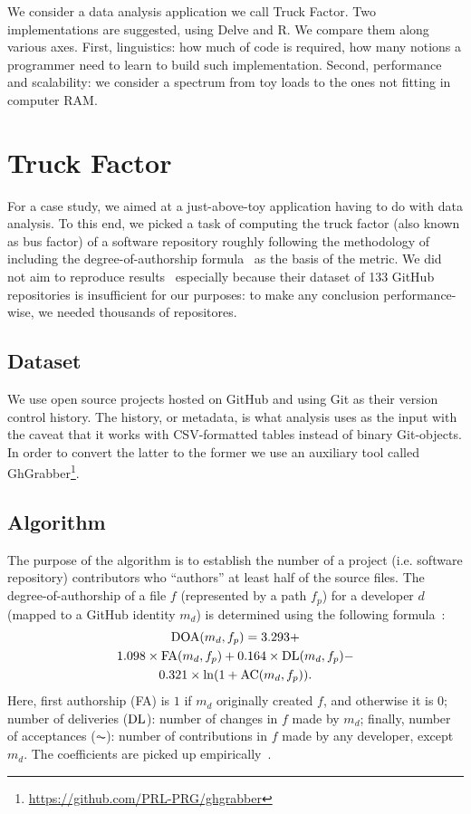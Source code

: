 We consider a data analysis application we call Truck Factor.
Two implementations are suggested, using Delve and R. We compare them
along various axes. First, linguistics: how much of code is required,
how many notions a programmer need to learn to build such implementation.
Second, performance and scalability: we consider a spectrum from
toy loads to the ones not fitting in computer RAM.

\section{Truck Factor}

For a case study, we aimed at a just-above-toy application having to
do with data analysis. To this end, we picked a task of computing the
truck factor (also known as bus factor) of a software repository
roughly following the methodology of~\cite{tf} including the
degree-of-authorship formula~\cite{doa} as the basis of the metric.
We did not aim to reproduce results~\cite{tf}
especially because their dataset of 133 GitHub repositories is insufficient
for our purposes: to make any conclusion performance-wise, we needed
thousands of repositores.

\subsection{Dataset}

We use open source projects hosted on GitHub and using Git as their
version control history. The history, or metadata, is what analysis
uses as the input with the caveat that it works with CSV-formatted
tables instead of binary Git-objects. In order to convert the latter
to the former we use an auxiliary tool called
GhGrabber\footnote{\url{https://github.com/PRL-PRG/ghgrabber}}.

\subsection{Algorithm}

The purpose of the algorithm is to establish the number of a project
(i.e. software repository) contributors who ``authors'' at least half of
the source files. The degree-of-authorship of a file $f$ (represented
by a path $f_p$)
for a developer $d$ (mapped to a GitHub identity $m_d$)
is determined using the following formula~\cite{tf}:
\begin{multline}
\operatorname{DOA}(m_d, f_p) =
  3.293 + \\
  1.098\times \operatorname{FA}(m_d, f_p) +
  0.164\times \operatorname{DL}(m_d, f_p) - \\
  0.321\times \ln(1 + \operatorname{AC}(m_d, f_p)).
\end{multline}
Here, first authorship (FA) is $1$ if $m_d$ originally created $f$, and
otherwise it is $0$; number of deliveries ($\operatorname{DL}$): number of changes in $f$
made by $m_d$; finally, number of acceptances ($\AC$): number of
contributions in $f$ made by any developer, except $m_d$. The coefficients
are picked up empirically~\cite{doa}.

